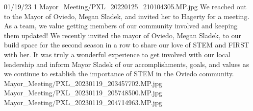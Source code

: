 {01/19/23}
{1}
{Mayor_Meeting/PXL_20220125_210104305.MP.jpg}
{We reached out to the Mayor of Oviedo, Megan Sladek, and invited her to Hagerty for a meeting.}
{As a team, we value getting members of our community involved and keeping them updated! We recently invited the mayor of Oviedo, Megan Sladek, to our build space for the second season in a row to share our love of STEM and FIRST with her. It was truly a wonderful experience to get involved with our local leadership and inform Mayor Sladek of our accomplishments, goals, and values as we continue to establish the importance of STEM in the Oviedo community. 
} 
{Mayor_Meeting/PXL_20230119_203457702.MP.jpg}
{Mayor_Meeting/PXL_20230119_205748500.MP.jpg}
{Mayor_Meeting/PXL_20230119_204714963.MP.jpg}
